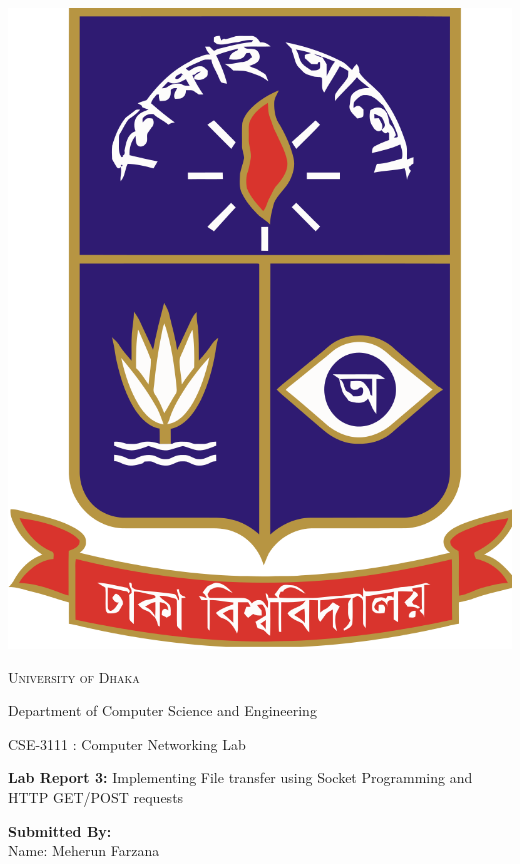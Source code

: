 \documentclass[11pt]{article}
\begin{document}
\begin{titlepage}
    \begin{center}
    	\includegraphics[scale=0.10]{du.png}\par
		\begin{Huge}
			\textsc{University of Dhaka}\par
		\end{Huge}
		\begin{Large}
            Department of Computer Science and Engineering\par \vspace{0.5cm}
            CSE-3111 : Computer Networking Lab \\[12pt]	
        \end{Large}
        \textbf{Lab Report 3:}
        Implementing File transfer using Socket Programming and HTTP
GET/POST requests \\[8pt]
        \begin{large}
            \textbf{Submitted By:\\[12pt]}
            Name: Meherun Farzana\\[8pt]

\end{large}
\end{center}
\end{titlepage}
\end{document}
